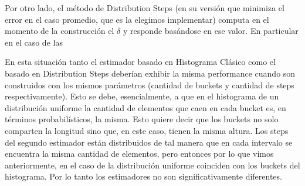 Por otro lado, el método de Distribution Steps (en su versión que minimiza el error en el caso promedio, que es la elegimos implementar) computa en el momento de la construcción el $\delta$ y responde basándose en ese valor. En particular en el caso de las 


En esta situación tanto el estimador basado en Histograma Clásico como el basado en Distribution Steps deberían exhibir la misma performance cuando son construidos con los mismos parámetros (cantidad de buckets y cantidad de steps respectivamente). Esto se debe, esencialmente, a que en el histograma de un distribución uniforme la cantidad de elementos que caen en cada bucket es, en términos probabilísticos, la misma. Esto quiere decir que los buckets no solo comparten la longitud sino que, en este caso, tienen la misma altura. Los steps del segundo estimador están distribuidos de tal manera que en cada intervalo se encuentra la misma cantidad de elementos, pero entonces por lo que vimos anteriormente, en el caso de la distribución uniforme coinciden con los buckets del histograma. Por lo tanto los estimadores no son significativamente diferentes.

